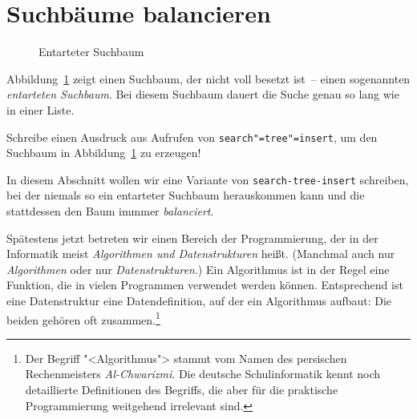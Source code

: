 \section{Suchbäume balancieren}

\begin{figure}[tb]
  \caption{Entarteter Suchbaum}
  \label{fig:degenerated-searchtree}
\end{figure}

Abbildung~\ref{fig:degenerated-searchtree} zeigt einen Suchbaum, der
nicht voll besetzt ist~-- einen sogenannten \textit{entarteten
  Suchbaum}. Bei
diesem Suchbaum dauert die Suche genau so lang wie in einer Liste.
%
\begin{aufgabeinline}
  Schreibe einen Ausdruck aus Aufrufen von
  \texttt{search"=tree"=insert}, um den Suchbaum in
  Abbildung~\ref{fig:degenerated-searchtree} zu erzeugen!
\end{aufgabeinline}
%
In diesem Abschnitt wollen wir eine Variante von
\lstinline{search-tree-insert} schreiben, bei der niemals so ein
entarteter Suchbaum herauskommen kann und die stattdessen den Baum
immmer \textit{balanciert}.

Spätestens jetzt betreten wir einen Bereich der Programmierung, der in
der Informatik meist \textit{Algorithmen und Datenstrukturen} heißt.
(Manchmal auch nur \textit{Algorithmen} oder nur
\textit{Datenstrukturen}.)  Ein Algorithmus ist in der Regel eine
Funktion, die in vielen Programmen verwendet werden können.
Entsprechend ist eine Datenstruktur eine Datendefinition, auf der ein
Algorithmus aufbaut: Die beiden gehören oft zusammen.\footnote{Der
  Begriff "<Algorithmus"> stammt vom Namen des persischen
  Rechenmeisters \textit{Al-Chwarizmi}.  Die deutsche Schulinformatik
  kennt noch detaillierte Definitionen des Begriffs, die aber für die
  praktische Programmierung weitgehend irrelevant sind.}

